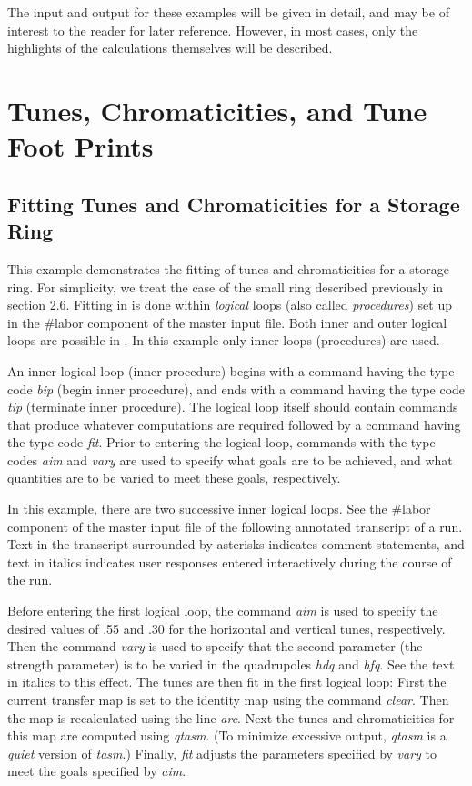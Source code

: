 The  input and output for these examples will be given in
detail, and may be of interest to the reader for later reference.
However, in most cases, only the highlights of the calculations
themselves will be described.

\section{Tunes, Chromaticities, and Tune Foot Prints}\label{tunes}
\subsection{Fitting Tunes and Chromaticities for a Storage Ring}
\label{fittingtunes}     

This example demonstrates the fitting of tunes and chromaticities for a
storage ring.  For simplicity, we treat the case of the small ring
described previously in section 2.6.  Fitting in \Mary is done within
{\em logical} loops (also called {\em procedures}) set up in the \#labor component of the master input file.
Both inner and outer logical loops are possible in \Maryend.  In this example only inner loops
(procedures) are used.

An inner logical loop (inner procedure) begins with a command having the type code {\em
bip} (begin inner procedure), and ends with a command having the type
code {\em tip} (terminate inner procedure).  The logical loop itself
should contain commands that produce whatever computations are required
followed by a command having the type code {\em fit}.  Prior to entering
the logical loop, commands with the type codes {\em aim} and {\em vary}
are used to specify what goals are to be achieved, and what quantities
are to be varied to meet these goals, respectively.

In this example, there are two successive inner logical loops.  See the
\#labor component of the master input file of the following annotated
transcript of a \Mary run.  Text in the transcript surrounded by
asterisks indicates comment statements, and text in italics indicates
user responses entered interactively during the course of the \Mary run.

Before entering the first logical loop, the command {\em aim} is used to specify
the desired values of .55 and .30 for the horizontal and vertical tunes,
respectively.  Then the command {\em vary} is used to specify that the
second parameter (the strength parameter) is to be varied in the
quadrupoles {\em hdq} and {\em hfq}.  See the text in italics to this
effect.  The tunes are then fit in the first logical loop:  First the
current transfer map is set to the identity map using the command {\em
clear}.  Then the map is recalculated using the line {\em arc}.  Next the tunes
and chromaticities for this map are computed using {\em qtasm}.  (To
minimize excessive output, {\em qtasm} is a {\em quiet} version of {\em
tasm}.)  Finally, {\em fit} adjusts the parameters specified by {\em
vary} to meet the goals specified by {\em aim}.

